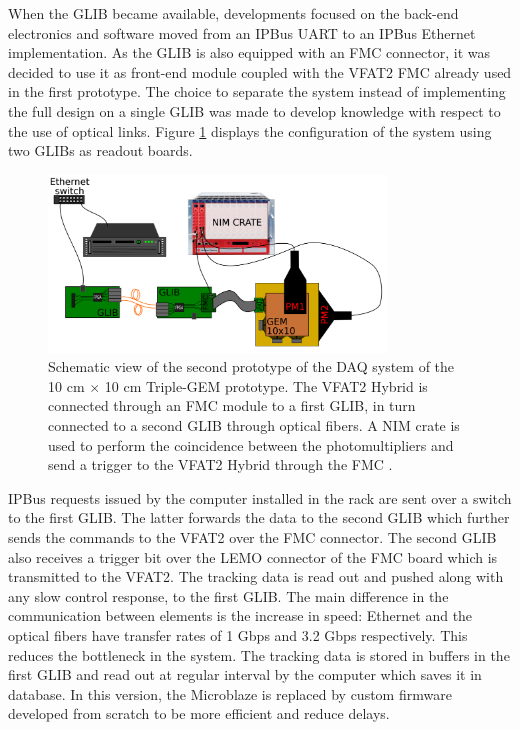     When the GLIB became available, developments focused on the back-end electronics and software moved from an IPBus UART to an IPBus Ethernet implementation. As the GLIB is also equipped with an FMC connector, it was decided to use it as front-end module coupled with the VFAT2 FMC already used in the first prototype. The choice to separate the system instead of implementing the full design on a single GLIB was made to develop knowledge with respect to the use of optical links. Figure \ref{fig:III-1-sys-2} displays the configuration of the system using two GLIBs as readout boards. \\

    \begin{figure}[t!]
      \centering
      \includegraphics[width=0.8\textwidth]{img/III-1-arch/sys_2.png}
      \caption{Schematic view of the second prototype of the DAQ system of the 10 cm $ \times $ 10 cm Triple-GEM prototype. The VFAT2 Hybrid is connected through an FMC module to a first GLIB, in turn connected to a second GLIB through optical fibers. A NIM crate is used to perform the coincidence between the photomultipliers and send a trigger to the VFAT2 Hybrid through the FMC \cite{Leonard:2065693}.}
      \label{fig:III-1-sys-2}
    \end{figure}

    IPBus requests issued by the computer installed in the rack are sent over a switch to the first GLIB. The latter forwards the data to the second GLIB which further sends the commands to the VFAT2 over the FMC connector. The second GLIB also receives a trigger bit over the LEMO connector of the FMC board which is transmitted to the VFAT2. The tracking data is read out and pushed along with any slow control response, to the first GLIB. The main difference in the communication between elements is the increase in speed: Ethernet and the optical fibers have transfer rates of 1 Gbps and 3.2 Gbps respectively. This reduces the bottleneck in the system. The tracking data is stored in buffers in the first GLIB and read out at regular interval by the computer which saves it in database. In this version, the Microblaze is replaced by custom firmware developed from scratch to be more efficient and reduce delays.

